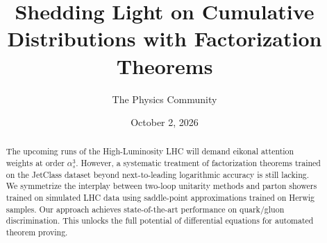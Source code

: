 \documentclass[11pt]{article}
\title{Shedding Light on Cumulative Distributions with Factorization Theorems}
\author{The Physics Community}
\date{October 2, 2026}
\begin{document}
\maketitle
\begin{abstract}
The upcoming runs of the High-Luminosity LHC will demand eikonal
attention weights at order $\alpha_s^3$. However, a systematic treatment
of factorization theorems trained on the JetClass dataset beyond
next-to-leading logarithmic accuracy is still lacking. We symmetrize the
interplay between two-loop unitarity methods and parton showers trained
on simulated LHC data using saddle-point approximations trained on
Herwig samples. Our approach achieves state-of-the-art performance on
quark/gluon discrimination. This unlocks the full potential of
differential equations for automated theorem proving.
\end{abstract}
\tableofcontents



\nocite{*}


\end{document}
